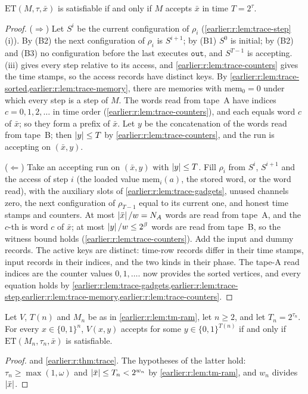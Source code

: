 \begin{theorem}\label{earlier:r:thm:trace}
\(\mathrm{ET}(M,\tau,\bar x)\) is satisfiable if and only if \(M\)
accepts \(\bar x\) in time \(T=2^\tau\).
\end{theorem}
\begin{proof}
(\(\Rightarrow\)) Let \(S^i\) be the current configuration of \(\rho_i\)
(\cref{earlier:r:lem:trace-step}(i)). By (B2) the next configuration of \(\rho_i\)
is \(S^{i+1}\); by (B1) \(S^0\) is initial; by (B2) and (B3) no
configuration before the last executes \(\mathtt{out}\), and
\(S^{T-1}\) is accepting. (iii) gives every step
relative to its access, and \cref{earlier:r:lem:trace-counters} gives the time
stamps, so the access records have distinct keys. By
\cref{earlier:r:lem:trace-sorted,earlier:r:lem:trace-memory}, there are memories with
\(\mathrm{mem}_0=0\) under which every step is a step of \(M\). The
words read from tape~A have indices \(c=0,1,2,\ldots\) in time order
(\cref{earlier:r:lem:trace-counters}), and each equals word \(c\) of \(\bar x\);
so they form a prefix of \(\bar x\). Let \(y\) be the concatenation of
the words read from tape~B; then \(\left|y\right|\le T\) by
\cref{earlier:r:lem:trace-counters}, and the run is accepting on \((\bar x,y)\).

(\(\Leftarrow\)) Take an accepting run on \((\bar x,y)\) with
\(\left|y\right|\le T\). Fill \(\rho_i\) from \(S^i\), \(S^{i+1}\) and the
access of step \(i\) (the loaded value \(\mathrm{mem}_i(a)\), the stored
word, or the word read), with the auxiliary slots of
\cref{earlier:r:lem:trace-gadgets}, unused channels zero, the next configuration of \(\rho_{T-1}\) equal
to its current one, and honest time stamps and counters. At most \(\left|\bar x\right|/w=N_A\) words
are read from tape~A, and the \(c\)-th is word \(c\) of \(\bar x\); at
most \(\left|y\right|/w\le2^\beta\) words are read from tape~B, so the witness
bound holds (\cref{earlier:r:lem:trace-counters}). Add the input and dummy
records. The active keys are distinct: time-row records differ in their
time stamps, input records in their indices, and the two kinds in their
phase. The tape-A read indices are the counter values
\(0,1,\ldots\).  now provides the sorted
vertices, and every equation holds by
\cref{earlier:r:lem:trace-gadgets,earlier:r:lem:trace-step,earlier:r:lem:trace-memory,earlier:r:lem:trace-counters}.
\end{proof}

\begin{corollary}\label{earlier:r:cor:trace-verifier}
Let \(V\), \(T(n)\) and \(M_n\) be as in \cref{earlier:r:lem:tm-ram}, let
\(n\ge2\), and let \(T_n=2^{\tau_n}\). For every \(x\in\{0,1\}^n\),
\(V(x,y)\) accepts for some \(y\in\{0,1\}^{T(n)}\) if and only if
\(\mathrm{ET}(M_n,\tau_n,\bar x)\) is satisfiable.
\end{corollary}
\begin{proof}
 and \cref{earlier:r:thm:trace}. The hypotheses of the latter
hold: \(\tau_n\ge\max(1,\omega)\) and \(\left|\bar x\right|\le T_n<2^{w_n}\) by
\cref{earlier:r:lem:tm-ram}, and \(w_n\) divides \(\left|\bar x\right|\).
\end{proof}


